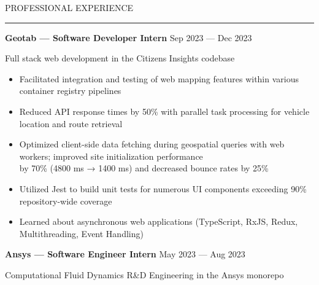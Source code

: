 \documentclass[9pt]{extarticle}
\begin{document}
\vspace{5pt}

\begin{adjustwidth}{4pt}{4pt} \large \textrm{PROFESSIONAL EXPERIENCE} \end{adjustwidth}
\rule[8pt]{\linewidth}{0.4pt}

\begin{adjustwidth}{10pt}{10pt}
	\vspace{-5pt}

	\textcolor{imptextblack}{\textbf{\large Geotab — Software Developer Intern}} \hfill Sep 2023 — Dec 2023
	
	Full stack web development in the Citizens Insights codebase
	
	\begin{itemize}[topsep=0pt, labelsep=10pt, leftmargin=24pt, label=\textcolor{imptextblack}{\textbullet}]
	  	\item Facilitated integration and testing of web mapping features within various container registry pipelines
		\item Reduced API response times by \textcolor{imptextblack}{50\%} with parallel task processing for vehicle location and route retrieval
		\item Optimized client-side data fetching during geospatial queries with web workers; improved site initialization performance \\
			by \textcolor{imptextblack}{70\% ({\small 4800 ms → 1400 ms})} and decreased bounce rates by \textcolor{imptextblack}{25\%} 
		\item Utilized Jest to build unit tests for numerous UI components exceeding \textcolor{imptextblack}{90\%} repository-wide coverage
		\item Learned about \textcolor{imptextblack}{asynchronous} web applications ({\small TypeScript, RxJS, Redux, Multithreading, Event Handling})
	\end{itemize}
	
	\vspace{5pt}
	\textcolor{imptextblack}{\textbf{\large Ansys — Software Engineer Intern}} \hfill May 2023 — Aug 2023
	
	Computational Fluid Dynamics R\&D Engineering in the Ansys monorepo
	

\end{adjustwidth}
\end{document}
